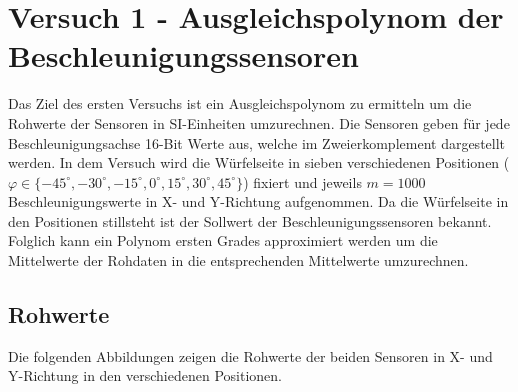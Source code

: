 \section{Versuch 1 - Ausgleichspolynom der Beschleunigungssensoren}
Das Ziel des ersten Versuchs ist ein Ausgleichspolynom zu ermitteln um die Rohwerte der Sensoren in SI-Einheiten umzurechnen. Die Sensoren geben für jede Beschleunigungsachse 16-Bit Werte aus, welche im Zweierkomplement dargestellt werden. In dem Versuch wird die Würfelseite in sieben verschiedenen Positionen ($\varphi \in \{-45^{\circ}, -30^{\circ}, -15^{\circ}, 0^{\circ}, 15^{\circ}, 30^{\circ}, 45^{\circ} \} $) fixiert und jeweils $m = 1000$ Beschleunigungswerte in X- und Y-Richtung aufgenommen. Da die Würfelseite in den Positionen stillsteht ist der Sollwert der Beschleunigungssensoren bekannt. Folglich kann ein Polynom ersten Grades approximiert werden um die Mittelwerte der Rohdaten in die entsprechenden Mittelwerte umzurechnen.

\subsection{Rohwerte}
Die folgenden Abbildungen zeigen die Rohwerte der beiden Sensoren in X- und Y-Richtung in den verschiedenen Positionen.

